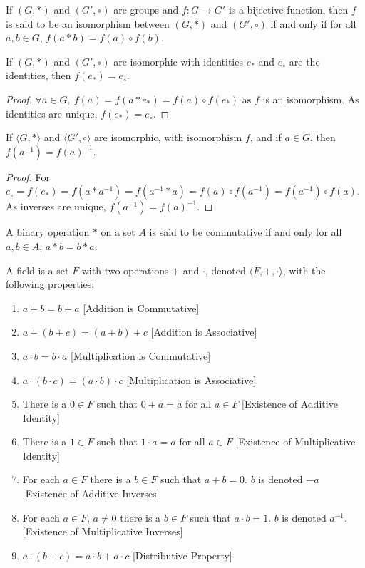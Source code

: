     \begin{definition}
        If $(G,*)$ and $(G',\circ)$ are groups and
        $f:G\rightarrow G'$ is a bijective function, then $f$ is said to
        be an isomorphism between $(G,*)$ and $(G',\circ)$ if and only if
        for all $a,b\in{G}$, $f(a*b)=f(a)\circ{f}(b)$.
    \end{definition}
    \begin{theorem}
        If $(G,*)$ and $(G',\circ)$ are isomorphic with identities $e_{*}$
        and $e_{\circ}$ are the identities, then $f(e_{*})=e_{\circ}$.
    \end{theorem}
    \begin{proof}
        $\forall a\in G,\ f(a)=f(a* e_*) = f(a)\circ f(e_*)$ as $f$ is
        an isomorphism. As identities are unique, $f(e_*)=e_{\circ}$.
    \end{proof}
    \begin{theorem}
    If $\langle G, * \rangle$ and $\langle G', \circ \rangle$ are isomorphic, with isomorphism $f$, and if $a\in G$, then $f(a^{-1}) = f(a)^{-1}$.
    \end{theorem}
    \begin{proof}
    For $e_{\circ}=f(e_*) = f(a*a^{-1}) = f(a^{-1}*a) = f(a)\circ f(a^{-1})=f(a^{-1})\circ f(a)$. As inverses are unique, $f(a^{-1})=f(a)^{-1}$.
    \end{proof}
    \begin{definition}
    A binary operation $*$ on a set $A$ is said to be commutative if and only for all $a,b\in A$, $a*b = b*a$.
    \end{definition}
    \begin{definition}
    A field is a set $F$ with two operations $+$ and $\cdot$, denoted $\langle F, +,\cdot \rangle$, with the following properties:
    \begin{enumerate}
    \item $a+b=b+a$ \hfill [Addition is Commutative]
    \item $a+(b+c)=(a+b)+c$ \hfill [Addition is Associative]
    \item $a\cdot b = b\cdot a$ \hfill [Multiplication is Commutative]
    \item $a\cdot (b\cdot c) = (a\cdot b)\cdot c$ \hfill [Multiplication is Associative]
    \item There is a $0\in F$ such that $0+a=a$ for all $a\in F$ \hfill [Existence of Additive Identity]
    \item There is a $1\in F$ such that $1\cdot a = a$ for all $a\in F$ \hfill [Existence of Multiplicative Identity]
    \item For each $a\in F$ there is a $b\in F$ such that $a+b = 0$. $b$ is denoted $-a$ \hfill [Existence of Additive Inverses]
    \item For each $a\in F$, $a\ne 0$ there is a $b\in F$ such that $a\cdot b = 1$. $b$ is denoted $a^{-1}$. \hfill [Existence of Multiplicative Inverses]
    \item $a\cdot(b+c) = a\cdot b + a\cdot c$ \hfill [Distributive Property]
    \end{enumerate}
    \end{definition}
